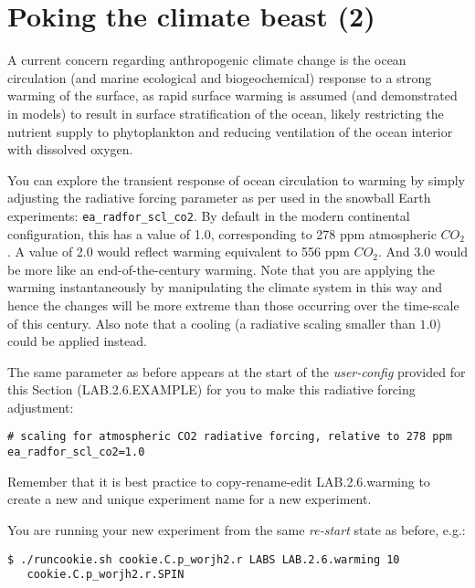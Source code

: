 \section{Poking the climate beast (2)}

A current concern regarding anthropogenic climate change is the ocean circulation (and marine ecological and biogeochemical) response to a strong warming of the surface, as rapid surface warming is assumed (and demonstrated in models) to result in surface stratification of the ocean, likely restricting the nutrient supply to phytoplankton and reducing ventilation of the ocean interior with dissolved oxygen.

You can explore the transient response of ocean circulation to warming by simply adjusting the radiative forcing parameter as per used in the snowball Earth experiments: \texttt{ea\_radfor\_scl\_co2}. By default in the modern continental configuration, this has a value of 1.0, corresponding to 278 ppm atmospheric \(CO_{2}\). A value of 2.0 would reflect warming equivalent to 556 ppm \(CO_{2}\). And 3.0 would be more like an end-of-the-century warming. Note that you are applying the warming instantaneously by manipulating the climate system in this way and hence the changes will be more extreme than those occurring over the time-scale of this century. Also note that a cooling (a radiative scaling smaller than $1.0$) could be applied instead.

The same parameter as before appears at the start of the \textit{user-config} provided for this Section (\textsf{\footnotesize LAB.2.6.EXAMPLE}) for you to make this radiative forcing adjustment:

\vspace{-2mm}\small\begin{verbatim}
# scaling for atmospheric CO2 radiative forcing, relative to 278 ppm
ea_radfor_scl_co2=1.0
\end{verbatim}\normalsize\vspace{-2mm}

Remember that it is best practice to copy-rename-edit \textsf{\footnotesize LAB.2.6.warming} to create a new and unique experiment name for a new experiment.

\vspace{1mm}
You are running your new experiment from the same \textit{re-start} state as before, e.g.:

\vspace{-2mm}\small\begin{verbatim}
$ ./runcookie.sh cookie.C.p_worjh2.r LABS LAB.2.6.warming 10 
   cookie.C.p_worjh2.r.SPIN
\end{verbatim}\normalsize\vspace{-2mm}

